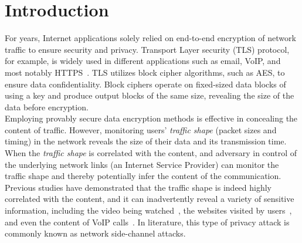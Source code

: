 
\chapter{Introduction}
\label{ch:introduction}

For years, Internet applications solely relied on end-to-end encryption of network traffic to ensure security and privacy.
Transport Layer security (TLS) protocol, for example, is widely used in different applications such as email, VoIP, and most notably HTTPS~\cite{rfc2818}.
TLS utilizes block cipher algorithms, such as AES, to ensure data confidentiality.
Block ciphers operate on fixed-sized data blocks of using a key and produce output blocks of the same size, revealing the size of the data before encryption. 
\\  
Employing provably secure data encryption methods is effective in concealing the content of traffic.
However, monitoring users' \textit{traffic shape} (\ie packet sizes and timing) in the network reveals the size of their data and its transmission time.
When the \textit{traffic shape} is correlated with the content, and adversary in control of the underlying network links (\eg an Internet Service Provider) can monitor the traffic shape and thereby potentially infer the content of the communication.
Previous studies have demonstrated that the traffic shape is indeed highly correlated with the content, and it can inadvertently reveal a variety of sensitive information, including the video being watched~\cite{schuster2017beautyburst}, the websites visited by users~\cite{wang2014supersequence, bhat2019varcnn}, and even the content of VoIP calls~\cite{white2011phonotactic}.
In literature, this type of privacy attack is commonly known as network side-channel attacks.



